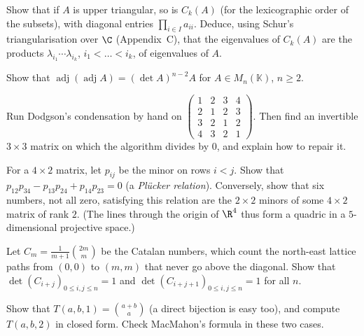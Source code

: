 \begin{exercise}[$\star$]\label{linear:ex:compoundeig}
Show that if $A$ is upper triangular, so is $C_k(A)$ (for the lexicographic order of the subsets), with diagonal entries
$\prod_{i\in I}a_{ii}$. Deduce, using Schur's triangularisation over $\C$ (Appendix~C), that the eigenvalues of $C_k(A)$ are the
products $\lambda_{i_1}\cdots\lambda_{i_k}$, $i_1<\dots<i_k$, of eigenvalues of $A$.
\end{exercise}

\begin{exercise}[$\star\star$]\label{linear:ex:adjadj}
Show that $\operatorname{adj}(\operatorname{adj}A)=(\det A)^{n-2}A$ for $A\in M_n(\mathbb K)$, $n\ge2$.
\end{exercise}

\begin{exercise}[$\star$]\label{linear:ex:dodgson}
Run Dodgson's condensation by hand on $\begin{pmatrix}1&2&3&4\\2&1&2&3\\3&2&1&2\\4&3&2&1\end{pmatrix}$. Then find an invertible
$3\times3$ matrix on which the algorithm divides by $0$, and explain how to repair it.
\end{exercise}

\begin{exercise}[$\star\star$]\label{linear:ex:plucker}
For a $4\times2$ matrix, let $p_{ij}$ be the minor on rows $i<j$. Show that $p_{12}p_{34}-p_{13}p_{24}+p_{14}p_{23}=0$ (a
\emph{Pl\"ucker relation}). Conversely, show that six numbers, not all zero, satisfying this relation are the $2\times2$ minors
of some $4\times2$ matrix of rank $2$. (The lines through the origin of $\R^4$ thus form a quadric in a $5$-dimensional
projective space.)
\end{exercise}

\begin{exercise}[$\star\star$]\label{linear:ex:catalan}
Let $C_m=\frac1{m+1}\binom{2m}m$ be the Catalan numbers, which count the north-east lattice paths from $(0,0)$ to $(m,m)$
that never go above the diagonal. Show that $\det(C_{i+j})_{0\le i,j\le n}=1$ and $\det(C_{i+j+1})_{0\le i,j\le n}=1$
for all $n$.
\end{exercise}

\begin{exercise}[$\star\star$]\label{linear:ex:hex2}
Show that $T(a,b,1)=\binom{a+b}a$ (a direct bijection is easy too), and compute $T(a,b,2)$ in closed form. Check MacMahon's
formula in these two cases.
\end{exercise}

